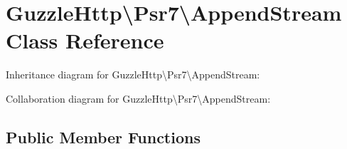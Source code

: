 \hypertarget{classGuzzleHttp_1_1Psr7_1_1AppendStream}{}\section{Guzzle\+Http\textbackslash{}Psr7\textbackslash{}Append\+Stream Class Reference}
\label{classGuzzleHttp_1_1Psr7_1_1AppendStream}


Inheritance diagram for Guzzle\+Http\textbackslash{}Psr7\textbackslash{}Append\+Stream\+:


Collaboration diagram for Guzzle\+Http\textbackslash{}Psr7\textbackslash{}Append\+Stream\+:
\subsection*{Public Member Functions}
